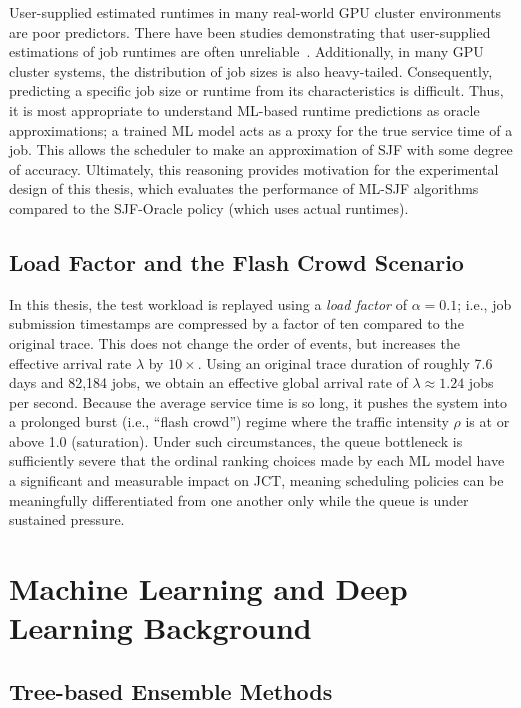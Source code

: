 User-supplied estimated runtimes in many real-world GPU cluster environments are poor predictors. There have been studies demonstrating that user-supplied estimations of job runtimes are often unreliable~\cite{tsafrir2007backfill}. Additionally, in many GPU cluster systems, the distribution of job sizes is also heavy-tailed. Consequently, predicting a specific job size or runtime from its characteristics is difficult. Thus, it is most appropriate to understand ML-based runtime predictions as oracle approximations; a trained ML model acts as a proxy for the true service time of a job. This allows the scheduler to make an approximation of SJF with some degree of accuracy. Ultimately, this reasoning provides motivation for the experimental design of this thesis, which evaluates the performance of ML-SJF algorithms compared to the SJF-Oracle policy (which uses actual runtimes).

\subsection{Load Factor and the Flash Crowd Scenario}

In this thesis, the test workload is replayed using a \textit{load factor} of $\alpha = 0.1$; i.e., job submission timestamps are compressed by a factor of ten compared to the original trace. This does not change the order of events, but increases the effective arrival rate $\lambda$ by $10\times$. Using an original trace duration of roughly 7.6 days and 82,184 jobs, we obtain an effective global arrival rate of $\lambda \approx 1.24$ jobs per second. Because the average service time is so long, it pushes the system into a prolonged burst (i.e., ``flash crowd'') regime where the traffic intensity $\rho$ is at or above 1.0 (saturation). Under such circumstances, the queue bottleneck is sufficiently severe that the ordinal ranking choices made by each ML model have a significant and measurable impact on JCT, meaning scheduling policies can be meaningfully differentiated from one another only while the queue is under sustained pressure.


\section{Machine Learning and Deep Learning Background}
\label{sec:mlbackground}

\subsection{Tree-based Ensemble Methods}


